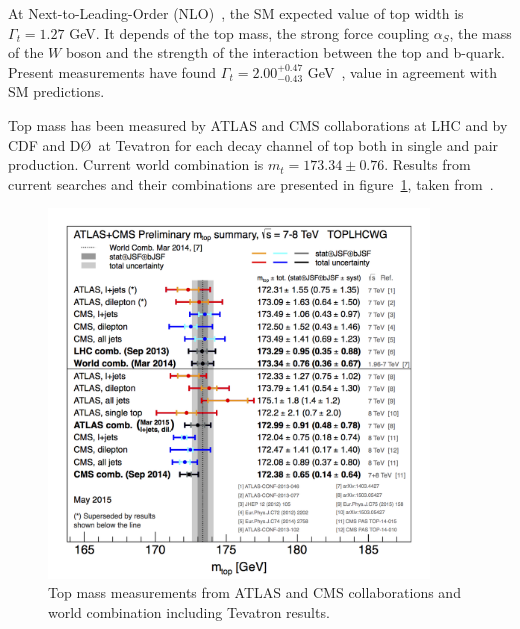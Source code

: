 At Next-to-Leading-Order (NLO)~\cite{Jezabek19891}, the SM expected value of top width is $\Gamma_{t}=1.27$ GeV. It depends of the top mass, the strong force coupling $\alpha_{S}$, the mass of the $W$ boson and the strength of the interaction between the top and b-quark. Present measurements have found $\Gamma_{t}=2.00^{+0.47}_{-0.43}$ GeV~\cite{Abazov:2012vd}, value in agreement with SM predictions. 

Top mass has been measured by ATLAS and CMS collaborations at LHC and by CDF and D\O~at Tevatron for each decay channel of top both in single and pair production. Current world combination is $m_{t}=173.34\pm 0.76$. Results from current searches and their combinations are presented in figure~\ref{fig:TopMass}, taken from~\cite{TOPLHCWG}. 

\begin{figure}[!Hhtbp]
  \begin{center}
    \includegraphics[width=0.9\textwidth]{figs/LHC_topmass_May2015.png}
    \caption{Top mass measurements from ATLAS and CMS collaborations and world combination including Tevatron results.}
    \label{fig:TopMass}
  \end{center}
\end{figure}

%
%

